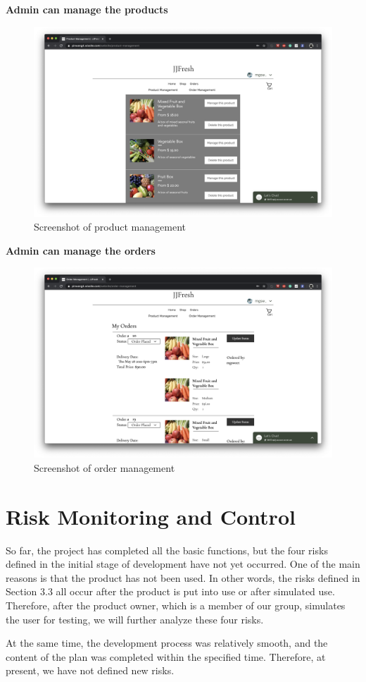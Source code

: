 \documentclass{report}
\begin{document}
\clearpage
\textbf{Admin can manage the products}
\begin{figure}[htp]
\centering
\includegraphics[width=\textwidth]{Figures/adminProduct.png}
\caption{Screenshot of product management}
\label{fig:adminProduct}
\end{figure}

\clearpage
\textbf{Admin can manage the orders}
\begin{figure}[htp]
\centering
\includegraphics[width=\textwidth]{Figures/adminOrder.png}
\caption{Screenshot of order management}
\label{fig:adminOrder}
\end{figure}

\section{Risk Monitoring and Control}
So far, the project has completed all the basic functions, but the four risks defined in the initial stage of development have not yet occurred. One of the main reasons is that the product has not been used. In other words, the risks defined in Section 3.3 all occur after the product is put into use or after simulated use. Therefore, after the product owner, which is a member of our group, simulates the user for testing, we will further analyze these four risks.

At the same time, the development process was relatively smooth, and the content of the plan was completed within the specified time. Therefore, at present, we have not defined new risks. 
\end{document}
